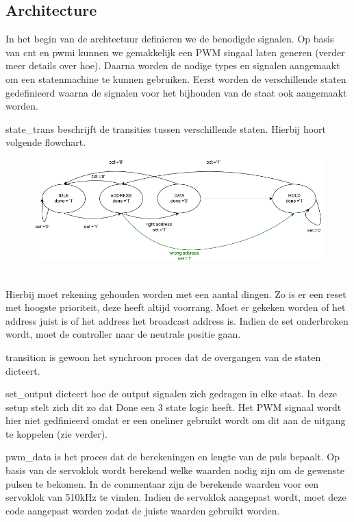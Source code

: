 \subsection{Architecture}
In het begin van de archtectuur definieren we de benodigde signalen. Op basis van cnt en pwmi kunnen we gemakkelijk een PWM singaal laten generen (verder meer details over hoe). Daarna worden de nodige types en signalen aangemaakt om een statenmachine te kunnen gebruiken. Eerst worden de verschillende staten gedefinieerd waarna de signalen voor het bijhouden van de staat ook aangemaakt worden.


state\_trans beschrijft de transities tussen verschillende staten. Hierbij hoort volgende flowchart.
\begin{figure}[h]
	\includegraphics[width=\linewidth]{servocontrol.png}
\end{figure}\\
Hierbij moet rekening gehouden worden met een aantal dingen. Zo is er een reset met hoogste prioriteit, deze heeft altijd voorrang. Moet er gekeken worden of het address juist is of het address het broadcast address is. Indien de set onderbroken wordt, moet de controller naar de neutrale positie gaan.


transition is gewoon het synchroon proces dat de overgangen van de staten dicteert.


set\_output dicteert hoe de output signalen zich gedragen in elke staat. In deze setup stelt zich dit zo dat Done een 3 state logic heeft. Het PWM signaal wordt hier niet gedfinieerd omdat er een oneliner gebruikt wordt om dit aan de uitgang te koppelen (zie verder).


pwm\_data is het proces dat de berekeningen en lengte van de puls bepaalt. Op basis van de servoklok wordt berekend welke waarden nodig zijn om de gewenste pulsen te bekomen. In de commentaar zijn de berekende waarden voor een servoklok van 510kHz te vinden. Indien de servoklok aangepast wordt, moet deze code aangepast worden zodat de juiste waarden gebruikt worden.

